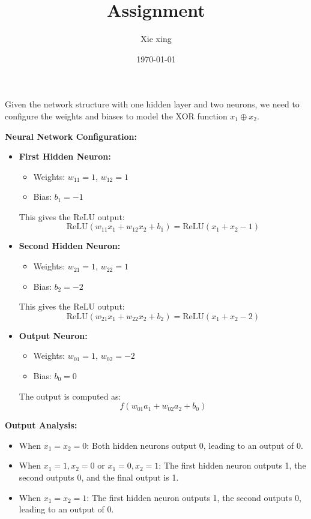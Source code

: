 \documentclass[oneside,solution]{seu-ml-assign}
\title{Assignment}
\author{Xie xing}
\date{\today}
\begin{document}
\maketitle


\subproblem{}
Given the network structure with one hidden layer and two neurons, we need to configure the weights
and biases to model the XOR function $x_1 \oplus x_2$.

\textbf{Neural Network Configuration:}

\begin{itemize}
  \item \textbf{First Hidden Neuron:}
        \begin{itemize}
          \item Weights: $w_{11} = 1$, $w_{12} = 1$
          \item Bias: $b_1 = -1$
        \end{itemize}
        This gives the ReLU output:
        \[
          \text{ReLU}(w_{11}x_1 + w_{12}x_2 + b_1) = \text{ReLU}(x_1 + x_2 - 1)
        \]

  \item \textbf{Second Hidden Neuron:}
        \begin{itemize}
          \item Weights: $w_{21} = 1$, $w_{22} = 1$
          \item Bias: $b_2 = -2$
        \end{itemize}
        This gives the ReLU output:
        \[
          \text{ReLU}(w_{21}x_1 + w_{22}x_2 + b_2) = \text{ReLU}(x_1 + x_2 - 2)
        \]

  \item \textbf{Output Neuron:}
        \begin{itemize}
          \item Weights: $w_{01} = 1$, $w_{02} = -2$
          \item Bias: $b_0 = 0$
        \end{itemize}
        The output is computed as:
        \[
          f(w_{01}a_1 + w_{02}a_2 + b_0)
        \]
\end{itemize}

\textbf{Output Analysis:}
\begin{itemize}
  \item When $x_1 = x_2 = 0$: Both hidden neurons output 0, leading to an output of 0.
  \item When $x_1 = 1, x_2 = 0$ or $x_1 = 0, x_2 = 1$: The first hidden neuron outputs 1, the second outputs 0, and the final output is 1.
  \item When $x_1 = x_2 = 1$: The first hidden neuron outputs 1, the second outputs 0, leading to an output of 0.
\end{itemize}
\end{document}
